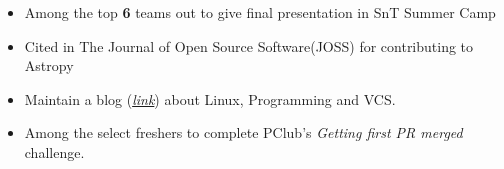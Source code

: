 
{\fontsize{11pt}{1em}\bodyfontlight\upshape\color{text}
\begin{itemize}
  \itemsep-0.3em
  \item Among the top \textbf{6} teams out to give final presentation in SnT Summer Camp
  \item Cited in The Journal of Open Source Software(JOSS) for contributing to Astropy\textsuperscript{\texttrademark}
  \item Maintain a blog (\textit{\href{http://aniketpandey.com/homepage}{link}}) about Linux, Programming and VCS.
  \item Among the select freshers to complete PClub's \textit{Getting first PR merged} challenge.
\end{itemize}
}

